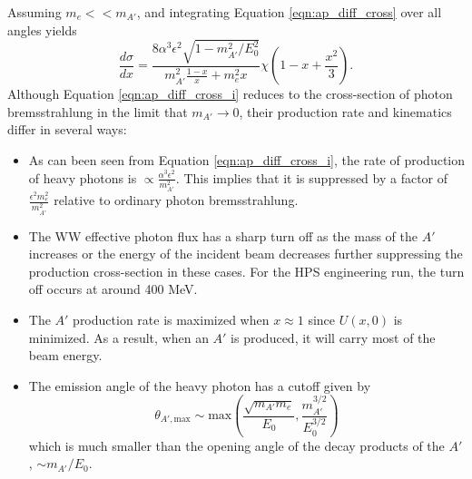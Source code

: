 Assuming $m_{e} << m_{A'}$, 
and integrating Equation \ref{eqn:ap_diff_cross} over all angles yields
\begin{equation}
    \label{eqn:ap_diff_cross_i}
    \frac{d\sigma}{dx} = \frac{8\alpha^{3}\epsilon^{2} \sqrt{1-m_{A'}^{2}/E_{0}^{2}}}
    {m_{A'}^{2}\frac{1-x}{x} + m_{e}^{2}x}\chi
    \left( 1 - x + \frac{x^{2}}{3}\right).
\end{equation}
Although Equation \ref{eqn:ap_diff_cross_i} reduces to the cross-section of photon 
bremsstrahlung in the limit that $m_{A'} \rightarrow 0$, their production rate
and kinematics differ in several ways: 
\begin{itemize}
    \item As can been seen from Equation \ref{eqn:ap_diff_cross_i}, the rate of 
          production of heavy photons is $\propto \frac{\alpha^3 \epsilon^2}{m_{A'}^2}$.
          This implies that it is suppressed by a factor of 
          $\frac{\epsilon^{2}m_{e}^{2}}{m_{A'}^{2}}$ relative to ordinary photon 
          bremsstrahlung.
    \item The WW effective photon flux has a sharp turn off as the mass of the 
          $A'$ increases or the energy of the incident beam decreases further
          suppressing the production cross-section in these cases.  For the 
          HPS engineering run, the turn off occurs at around 400 MeV.
    \item The $A'$ production rate is maximized when $x \approx 1$ since 
          $U(x, 0)$  is minimized.  As a result, when an $A'$ is produced, 
          it will carry most of the beam energy.
      \item The emission angle of the heavy photon has a cutoff given by 
          \begin{equation}
              \theta_{A', \text{max}} \sim \text{max}\left(\frac{\sqrt{m_{A'}m_e}}{E_0}, 
              \frac{m_{A'}^{3/2}}{E_{0}^{3/2}}\right)
          \end{equation}
          which is much smaller than the opening angle of the decay products of
          the $A'$, $\sim m_{A'}/E_{0}$. 
\end{itemize}


